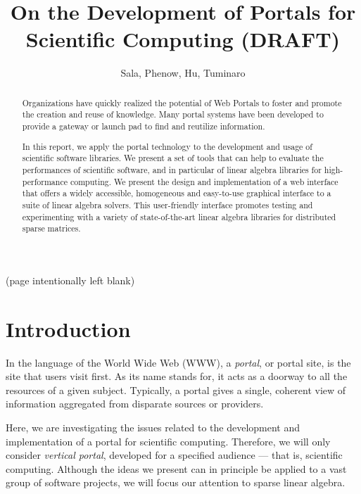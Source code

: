 \documentclass[11pt,relax]{SANDreport}
\author{Sala, Phenow, Hu, Tuminaro}
\title{On the Development of Portals for Scientific Computing (DRAFT)}
\begin{document}
\maketitle

\begin{abstract}
Organizations have quickly realized the potential of Web Portals to foster and
promote the creation and reuse of knowledge. Many portal systems have been
developed to provide a gateway or launch pad to find and reutilize
information.

In this report, we apply the portal technology to the development and usage of
scientific software libraries.  We present a set of tools that can help to
evaluate the performances of scientific software, and in particular of linear
algebra libraries for high-performance computing. We present the design and
implementation of a  web interface that offers a widely accessible,
               homogeneous and easy-to-use graphical interface to a suite of
               linear algebra solvers.  This user-friendly interface promotes
               testing and experimenting with a variety of state-of-the-art
               linear algebra libraries for distributed sparse matrices.
\end{abstract}

\clearpage
\begin{center}
(page intentionally left blank)
\end{center}

\SANDmain

\tableofcontents

\clearpage
\newpage


\section{Introduction}

In the language of the World Wide Web (WWW), a {\sl portal}, or portal site,
is the site that users visit first. As its name stands for, it acts as a
doorway to all the resources of a given subject. Typically, a portal gives a
single, coherent view of information aggregated from disparate sources or
providers. 

Here, we are investigating the issues related to the development
and implementation of a portal for scientific computing. Therefore, we will
only consider {\sl vertical portal}, developed for a specified audience ---
that is, scientific computing. Although the ideas we present can in principle
be applied to a vast group of software projects, we will focus our attention
to sparse linear algebra.
\end{document}
